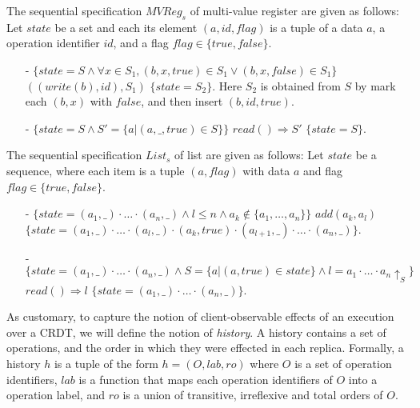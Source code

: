 \begin{example}
\label{definition:sequential specification of multi-value register}
The sequential specification $\mathit{MVReg}_s$ of multi-value register are given as follows: Let $state$ be a set and each its element $(a,id,flag)$ is a tuple of a data $a$, a operation identifier $id$, and a flag $flag \in \{ \mathit{true},\mathit{false} \}$.
\begin{itemize}
\setlength{\itemsep}{0.5pt}
\item[-] $\{ state = S \wedge \forall x \in S_1, (b,x,\mathit{true}) \in S_1 \vee (b,x,\mathit{false}) \in S_1 \}$ $((write(b),id),S_1)$ $\{ state = S_2 \}$. Here $S_2$ is obtained from $S$ by mark each $(b,x)$ with $\mathit{false}$, and then insert $(b,id,\mathit{true})$. 
\item[-] $\{ state = S \wedge S' = \{ a \vert (a,\_,\mathit{true}) \in S \} \}$ $read() \Rightarrow S'$ $\{ state = S \}$. 
\end{itemize}
\end{example} 


\begin{example}
\label{definition:sequential specification of list with add-after interface} 
The sequential specification $\mathit{List}_s$ of list are given as follows: Let $state$ be a sequence, where each item is a tuple $(a,flag)$ with data $a$ and flag $flag \in \{ \mathit{true},\mathit{false} \}$. 
\begin{itemize}
\setlength{\itemsep}{0.5pt}
\item[-] $\{ state = (a_1,\_) \cdot \ldots \cdot (a_n,\_) \wedge l \leq n \wedge a_k \notin \{ a_1, \ldots, a_n \} \}$ $add(a_k,a_l)$ $\{ state = (a_1,\_) \cdot \ldots \cdot (a_l,\_) \cdot (a_k,\mathit{true}) \cdot (a_{l+1},\_) \cdot \ldots \cdot (a_n,\_) \}$.
\item[-] $\{ state = (a_1,\_) \cdot \ldots \cdot (a_n,\_) \wedge S = \{ a \vert (a,\mathit{true}) \in state \} \wedge l = a_1 \cdot \ldots \cdot a_n \uparrow_{S} \}$ $read() \Rightarrow l$ $\{ state = (a_1,\_) \cdot \ldots \cdot (a_n,\_) \}$. 
\end{itemize}
\end{example} 



As customary, to capture the notion of client-observable effects of an execution over a CRDT, we will define the notion of \emph{history}. A history contains a set of operations, and the order in which they were effected in each replica. Formally, a history $h$ is a tuple of the form $h = (O,\mathit{lab},\mathit{ro})$ where $O$ is a set of operation identifiers, $\mathit{lab}$ is a function that maps each operation identifiers of $O$ into a operation label, and $\mathit{ro}$ is a union of transitive, irreflexive and total orders of $O$.

